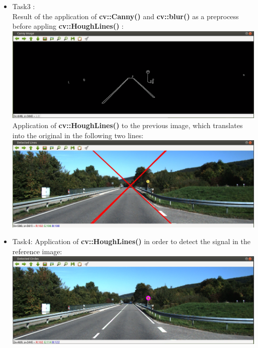 \documentclass{article}
\begin{document}
\begin{flushleft}
\begin{itemize}
  \item Task3 :\\
  Result of the application of \textbf{cv::Canny()} and \textbf{cv::blur()} as a preprocess before appling \textbf{cv::HoughLines()} :
  \includegraphics[scale = 0.35]{images/CannyImage_ForHoughLines.PNG}
  Application of \textbf{cv::HoughLines()} to the previous image, which translates into the original in the following two lines:
  \includegraphics[scale = 0.35]{images/HoughLines_On_Original_Image.PNG}
  \newpage
  \item Task4:
  Application of \textbf{cv::HoughLines()} in order to detect the signal in the reference image:
  \includegraphics[scale = 0.35]{images/CannyCircles.PNG}
  
  
  
\end{itemize}

\end{flushleft}
\end{document}
